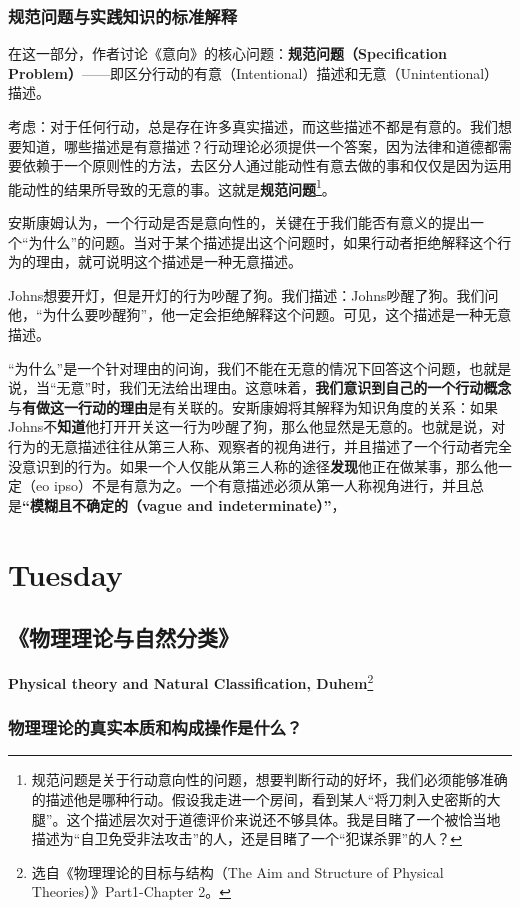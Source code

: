 \documentclass[12pt, a4paper, oneside]{ctexart}
\renewcommand{\b}{\textbf}
\newcommand{\f}{\footnote}
\begin{document}
\subsubsection{规范问题与实践知识的标准解释}
在这一部分，作者讨论《意向》的核心问题：\b{规范问题（Specification Problem）}——即区分行动的有意（Intentional）描述和无意（Unintentional）描述。

考虑：对于任何行动，总是存在许多真实描述，而这些描述不都是有意的。我们想要知道，哪些描述是有意描述？行动理论必须提供一个答案，因为法律和道德都需要依赖于一个原则性的方法，去区分人通过能动性有意去做的事和仅仅是因为运用能动性的结果所导致的无意的事。这就是\b{规范问题}\f{规范问题是关于行动意向性的问题，想要判断行动的好坏，我们必须能够准确的描述他是哪种行动。假设我走进一个房间，看到某人“将刀刺入史密斯的大腿”。这个描述层次对于道德评价来说还不够具体。我是目睹了一个被恰当地描述为“自卫免受非法攻击”的人，还是目睹了一个“犯谋杀罪”的人？}。

安斯康姆认为，一个行动是否是意向性的，关键在于我们能否有意义的提出一个“为什么”的问题。当对于某个描述提出这个问题时，如果行动者拒绝解释这个行为的理由，就可说明这个描述是一种无意描述。

Johns想要开灯，但是开灯的行为吵醒了狗。我们描述：Johns吵醒了狗。我们问他，“为什么要吵醒狗”，他一定会拒绝解释这个问题。可见，这个描述是一种无意描述。

“为什么”是一个针对理由的问询，我们不能在无意的情况下回答这个问题，也就是说，当“无意”时，我们无法给出理由。这意味着，\b{我们意识到自己的一个行动概念}与\b{有做这一行动的理由}是有关联的。安斯康姆将其解释为知识角度的关系：如果Johns不\b{知道}他打开开关这一行为吵醒了狗，那么他显然是无意的。也就是说，对行为的无意描述往往从第三人称、观察者的视角进行，并且描述了一个行动者完全没意识到的行为。如果一个人仅能从第三人称的途径\b{发现}他正在做某事，那么他一定（eo ipso）不是有意为之。一个有意描述必须从第一人称视角进行，并且总是\b{“模糊且不确定的（vague and indeterminate）”}，

\section{Tuesday}
\subsection{《物理理论与自然分类》}
\textbf{Physical theory and Natural Classification, Duhem}\f{选自《物理理论的目标与结构（The Aim and Structure of Physical Theories）》Part1-Chapter 2。}

\subsubsection{物理理论的真实本质和构成操作是什么？}
\end{document}
